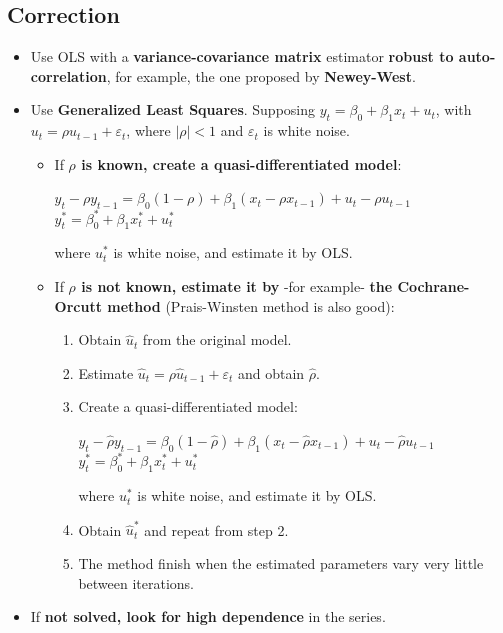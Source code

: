 \documentclass[10pt, a4paper, landscape]{extarticle}
\begin{document}
\begin{multicols}{3}
	\subsection*{Correction}
		\begin{itemize}[leftmargin=*]
			\item Use OLS with a \textbf{variance-covariance matrix} estimator \textbf{robust to auto-correlation}, for example, the one proposed by \textbf{Newey-West}.
			\item Use \textbf{Generalized Least Squares}. Supposing $y_t = \beta_0 + \beta_1 x_t + u_t$, with $u_t = \rho u_{t-1} + \varepsilon_t$, where $|\rho| < 1$ and $\varepsilon_t$ is white noise.
			\begin{itemize}[leftmargin=*]
				\item If \textbf{$\rho$ is known, create a quasi-differentiated model}:
				\begin{center}
					$y_t - \rho y_{t-1} = \beta_0 (1 - \rho) + \beta_1 (x_t - \rho x_{t-1}) + u_t - \rho u_{t-1}$
					\ $y_t^* = \beta_0^* + \beta_1 x_t^* + u_t^*$
				\end{center}
				where $u_t^*$ is white noise, and estimate it by OLS.
				\item If \textbf{$\rho$ is not known, estimate it by} -for example- \textbf{the Cochrane-Orcutt method} (Prais-Winsten method is also good):
				\begin{enumerate}[leftmargin=*]
					\item Obtain $\hat{u}_t$ from the original model.
					\item Estimate $\hat{u}_t = \rho \hat{u}_{t-1} + \varepsilon_t$ and obtain $\hat{\rho}$.
					\item Create a quasi-differentiated model:
					\begin{center}
						$y_t - \hat{\rho} y_{t-1} = \beta_0 (1 - \hat{\rho}) + \beta_1 (x_t - \hat{\rho} x_{t-1}) + u_t - \hat{\rho} u_{t-1}$
						\ $y_t^* = \beta_0^* + \beta_1 x_t^* + u_t^*$
					\end{center}
					where $u_t^*$ is white noise, and estimate it by OLS.
					\item Obtain $\hat{u}_t^*$ and repeat from step 2.
					\item The method finish when the estimated parameters vary very little between iterations.
				\end{enumerate}
			\end{itemize}
		\item If \textbf{not solved, look for high dependence} in the series.
		\end{itemize}


\end{multicols}
\end{document}
